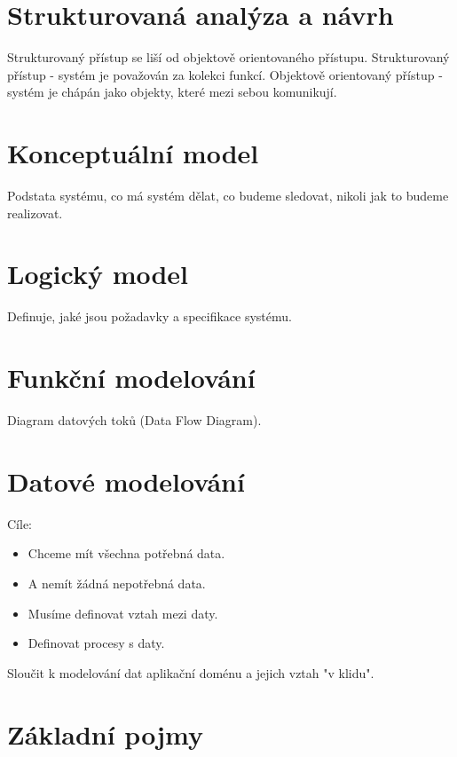 \documentclass{article}
\begin{document}
\sloppy

\section{Strukturovaná analýza a návrh}

Strukturovaný přístup se liší od objektově orientovaného přístupu.
Strukturovaný přístup - systém je považován za kolekci funkcí.
Objektově orientovaný přístup - systém je chápán jako objekty, které mezi sebou komunikují.

\section{Konceptuální model}

Podstata systému, co má systém dělat, co budeme sledovat, nikoli jak to budeme realizovat.

\section{Logický model}

Definuje, jaké jsou požadavky a specifikace systému.

\section{Funkční modelování}

Diagram datových toků (Data Flow Diagram).

\section{Datové modelování}

Cíle:
\begin{itemize}
    \item Chceme mít všechna potřebná data.
    \item A nemít žádná nepotřebná data.
    \item Musíme definovat vztah mezi daty.
    \item Definovat procesy s daty.
\end{itemize}
Sloučit k modelování dat aplikační doménu a jejich vztah "v klidu".

\section{Základní pojmy}
\end{document}
